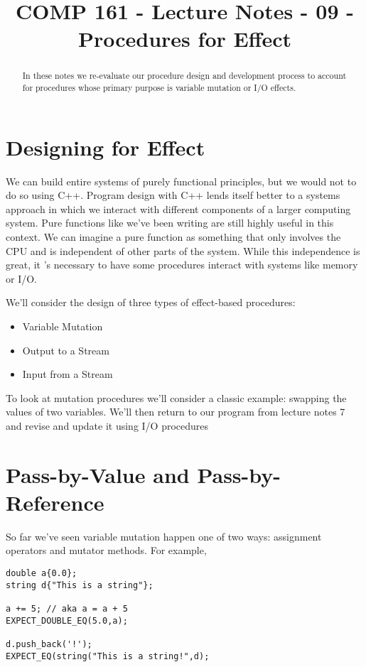 \documentclass[]{tufte-handout}
\title{COMP 161 - Lecture Notes - 09 - Procedures for Effect}
\begin{document}
 
\maketitle

\begin{abstract}
In these notes we re-evaluate our procedure design and development process to account for procedures whose primary purpose is variable mutation or I/O effects.
\end{abstract}

\section{ Designing for Effect }

We can build entire systems of purely functional principles, but we would not to do so using C++.  Program design with C++ lends itself better to a systems approach in which we interact with different components of a larger computing system.  Pure functions like we've been writing are still highly useful in this context. We can imagine a pure function as something that only involves the CPU and is independent of other parts of the system.  While this independence is great, it 's necessary to have some procedures interact with systems like memory or I/O.

We'll consider the design of three types of effect-based procedures:
\begin{itemize}
\item Variable Mutation
\item Output to a Stream
\item Input from a Stream
\end{itemize}    
To look at mutation procedures we'll consider a classic example: swapping the values of two variables. We'll then return to our program from lecture notes 7 and revise and update it using I/O procedures

\section{ Pass-by-Value and Pass-by-Reference }

So far we've seen variable mutation happen one of two ways: assignment operators and mutator methods. For example,
\begin{verbatim}
double a{0.0};
string d{"This is a string"};

a += 5; // aka a = a + 5
EXPECT_DOUBLE_EQ(5.0,a);

d.push_back('!');
EXPECT_EQ(string("This is a string!",d);
\end{verbatim}
\end{document}
